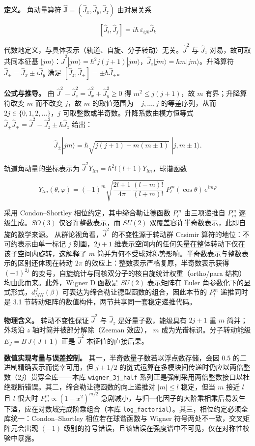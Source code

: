 \documentclass[
]{ctexbook}
\begin{document}
\textbf{定义。} 角动量算符
\(\hat{\mathbf{J}}=(\hat{J}_x,\hat{J}_y,\hat{J}_z)\) 由对易关系

\[[\hat{J}_i,\hat{J}_j]=i\hbar\,\varepsilon_{ijk}\hat{J}_k\]

代数地定义，与具体表示（轨道、自旋、分子转动）无关。\(\hat{J}^{2}\) 与
\(\hat{J}_z\) 对易，故可取共同本征基
\(|jm\rangle\)：\(\hat{J}^{2}|jm\rangle=\hbar^{2}j(j+1)|jm\rangle\)，\(\hat{J}_z|jm\rangle=\hbar m|jm\rangle\)。升降算符
\(\hat{J}_{\pm}=\hat{J}_x\pm i\hat{J}_y\) 满足
\([\hat{J}_z,\hat{J}_{\pm}]=\pm\hbar\hat{J}_{\pm}\)。

\textbf{公式与推导。} 由
\(\hat{J}^{2}-\hat{J}_z^{2}=\hat{J}_x^{2}+\hat{J}_y^{2}\ge0\) 得
\(m^{2}\le j(j+1)\)，故 \(m\) 有界；升降算符改变 \(m\) 而不改变
\(j\)，故 \(m\) 的取值范围为 \(-j,\ldots,j\) 的等差序列，从而
\(2j\in\{0,1,2,\ldots\}\)，\(j\) 可取整数或半奇数。升降系数由模方恒等式
\(\hat{J}_{\pm}\hat{J}_{\mp}=\hat{J}^{2}-\hat{J}_z^{2}\pm\hbar\hat{J}_z\)
给出：

\[\hat{J}_{\pm}|jm\rangle=\hbar\sqrt{j(j+1)-m(m\pm1)}\;|j,m\pm1\rangle.\]

轨道角动量的坐标表示为
\(\hat{J}^{2}Y_{lm}=\hbar^{2}l(l+1)Y_{lm}\)，球谐函数

\[Y_{lm}(\theta,\varphi)=(-1)^{m}\sqrt{\frac{2l+1}{4\pi}\,\frac{(l-m)!}{(l+m)!}}\;P_{l}^{m}(\cos\theta)\,e^{im\varphi}\]

采用 Condon--Shortley 相位约定，其中缔合勒让德函数 \(P_l^m\)
由三项递推自 \(P_m^m\) 逐级生成。\(SO(3)\) 仅容许整数表示，而 \(SU(2)\)
双覆盖容许半奇数表示，此即自旋的数学来源。 从群论视角看，\(\hat{J}^{2}\)
的不变性源于转动群 Casimir 算符的地位：不可约表示由单一标记 \(j\)
刻画，\(2j+1\)
维表示空间内的任何矢量在整体转动下仅在该子空间内旋转，这解释了 \(m\)
简并为何不受球对称势影响。半奇数表示与整数表示的区别还体现在转动
\(2\pi\) 的效应上：整数表示严格复原，半奇数表示获得 \((-1)^{2j}\)
的变号，自旋统计与同核双分子的核自旋统计权重（ortho/para
结构）均由此而来。此外，Wigner D 函数是 \(SU(2)\) 表示矩阵在 Euler
角参数化下的显式形式，\(d^{J}_{MK}(\beta)\)
可表达为缔合勒让德型函数的组合，因此本节的 \(P_l^m\) 递推同时是 3.1
节转动矩阵的数值构件，两节共享同一套稳定递推代码。

\textbf{物理含义。} 转动不变性保证 \(\hat{J}^{2}\) 与 \(\hat{J}_z\)
是好量子数，能级具有 \(2j+1\) 重 \(m\) 简并；外场沿 \(z\)
轴时简并被部分解除（Zeeman 效应）， \(m\) 成为光谱标识。分子转动能级
\(E_J=B\,J(J+1)\) 正是 \(\hat{J}^{2}\) 本征值的直接后果。

\textbf{数值实现考量与误差控制。} 其一，半奇数量子数若以浮点数存储，会因
\(0.5\) 的二进制精确表示而侥幸可用，但 \(j\pm1/2\)
的链式运算在多模块间传递时仍应以两倍整数（\(2j\)）贯穿全库------本库
\texttt{wigner\_3j\_half}
系列正是强制采用两倍整数接口以杜绝截断错误。其二，缔合勒让德函数的向上递推对
\(|m|\le l\) 稳定，但当 \(m\) 接近 \(l\) 且 \(l\) 很大时
\(P_m^m\propto(1-x^{2})^{m/2}\)
急剧减小，与归一化因子的大阶乘相乘后易发生下溢，应在对数域完成阶乘组合（本库
\texttt{log\_factorial}）。其三，相位约定必须全库统一：Condon--Shortley
相位若在球谐函数与 Wigner 符号两处不一致，交叉矩阵元会出现 \((-1)\)
级别的符号错误，且该错误在强度谱中不可见，仅在对称性校验中暴露。
\end{document}
